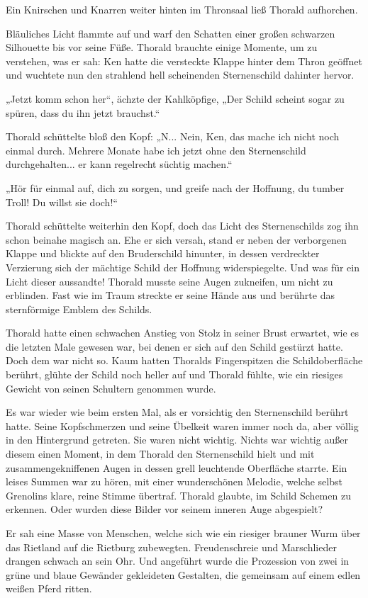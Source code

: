 \documentclass[10pt, a4paper, oneside]{book}
\begin{document}
Ein Knirschen und Knarren weiter hinten im Thronsaal ließ Thorald aufhorchen.

Bläuliches Licht flammte auf und warf den Schatten einer großen schwarzen Silhouette bis vor seine Füße. Thorald brauchte einige Momente, um zu verstehen, was er sah: Ken hatte die versteckte Klappe hinter dem Thron geöffnet und wuchtete nun den strahlend hell scheinenden Sternenschild dahinter hervor.

„Jetzt komm schon her“, ächzte der Kahlköpfige, „Der Schild scheint sogar zu spüren, dass du ihn jetzt brauchst.“

Thorald schüttelte bloß den Kopf: „N... Nein, Ken, das mache ich nicht noch einmal durch. Mehrere Monate habe ich jetzt ohne den Sternenschild durchgehalten... er kann regelrecht süchtig machen.“

„Hör für einmal auf, dich zu sorgen, und greife nach der Hoffnung, du tumber Troll! Du willst sie doch!“

Thorald schüttelte weiterhin den Kopf, doch das Licht des Sternenschilds zog ihn schon beinahe magisch an. Ehe er sich versah, stand er neben der verborgenen Klappe und blickte auf den Bruderschild hinunter, in dessen verdreckter Verzierung sich der mächtige Schild der Hoffnung widerspiegelte. Und was für ein Licht dieser aussandte! Thorald musste seine Augen zukneifen, um nicht zu erblinden. Fast wie im Traum streckte er seine Hände aus und berührte das sternförmige Emblem des Schilds.

Thorald hatte einen schwachen Anstieg von Stolz in seiner Brust erwartet, wie es die letzten Male gewesen war, bei denen er sich auf den Schild gestürzt hatte. Doch dem war nicht so. Kaum hatten Thoralds Fingerspitzen die Schildoberfläche berührt, glühte der Schild noch heller auf und Thorald fühlte, wie ein riesiges Gewicht von seinen Schultern genommen wurde.

Es war wieder wie beim ersten Mal, als er vorsichtig den Sternenschild berührt hatte. Seine Kopfschmerzen und seine Übelkeit waren immer noch da, aber völlig in den Hintergrund getreten. Sie waren nicht wichtig. Nichts war wichtig außer diesem einen Moment, in dem Thorald den Sternenschild hielt und mit zusammengekniffenen Augen in dessen grell leuchtende Oberfläche starrte. Ein leises Summen war zu hören, mit einer wunderschönen Melodie, welche selbst Grenolins klare, reine Stimme übertraf. Thorald glaubte, im Schild Schemen zu erkennen. Oder wurden diese Bilder vor seinem inneren Auge abgespielt?

Er sah eine Masse von Menschen, welche sich wie ein riesiger brauner Wurm über das Rietland auf die Rietburg zubewegten. Freudenschreie und Marschlieder drangen schwach an sein Ohr. Und angeführt wurde die Prozession von zwei in grüne und blaue Gewänder gekleideten Gestalten, die gemeinsam auf einem edlen weißen Pferd ritten.
\end{document}
